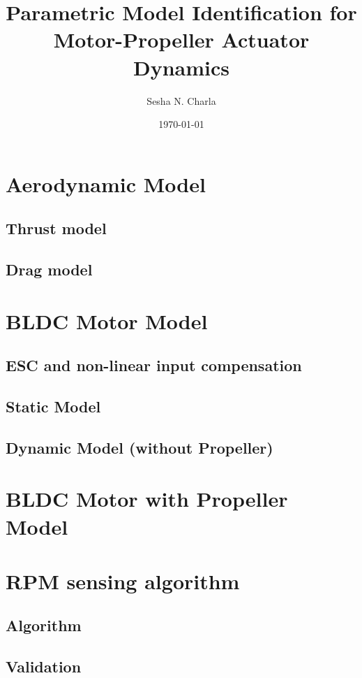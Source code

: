 \documentclass[letterpaper, 11pt]{article}
\title{Parametric Model Identification for Motor-Propeller Actuator Dynamics}
\author{Sesha N. Charla}
\date{\today}
\begin{document}
\maketitle
\tableofcontents
\newpage
\section{Aerodynamic Model}
\subsection{Thrust model}
\subsection{Drag model}
\newpage


\section{BLDC Motor Model}
\subsection{ESC and non-linear input compensation}
\subsection{Static Model}
\subsection{Dynamic Model (without Propeller)}
\newpage


\section{BLDC Motor with Propeller Model}
\newpage


\section{RPM sensing algorithm}
\subsection{Algorithm}
\subsection{Validation}
\newpage
\end{document}
